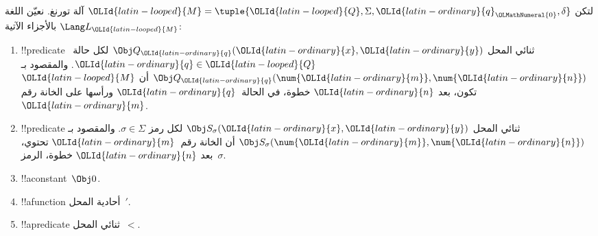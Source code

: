 \documentclass[../../../include/open-logic-section]{subfiles}
\begin{document}
\begin{defn}
لتكن $\OLId{latin-looped}{M}=\tuple{\OLId{latin-looped}{Q},\Sigma,\OLId{latin-ordinary}{q}_\OLMathNumeral{0},\delta}$ آلة تورنغ. نعيّن اللغة
$\Lang L_\OLId{latin-looped}{M}$ بالأجزاء الآتية:
\begin{enumerate}
\item !!{predicate} ثنائي المحل $ \Obj Q_\OLId{latin-ordinary}{q}(\OLId{latin-ordinary}{x},\OLId{latin-ordinary}{y})$ لكل حالة~$\OLId{latin-ordinary}{q}\in \OLId{latin-looped}{Q}$.
  والمقصود بـ$\Obj Q_\OLId{latin-ordinary}{q}(\num{\OLId{latin-ordinary}{m}},\num{\OLId{latin-ordinary}{n}})$ أن $\OLId{latin-looped}{M}$ تكون، بعد $\OLId{latin-ordinary}{n}$
  خطوة، في الحالة~$\OLId{latin-ordinary}{q}$ ورأسها على الخانة رقم~$\OLId{latin-ordinary}{m}$.
\item !!{predicate} ثنائي المحل $\Obj S_\sigma(\OLId{latin-ordinary}{x},\OLId{latin-ordinary}{y})$ لكل رمز
  $\sigma\in\Sigma$. والمقصود بـ$\Obj S_\sigma(\num{\OLId{latin-ordinary}{m}},\num{\OLId{latin-ordinary}{n}})$
  أن الخانة رقم~$\OLId{latin-ordinary}{m}$ تحتوي، بعد $\OLId{latin-ordinary}{n}$ خطوة، الرمز~$\sigma$.
\item !!a{constant}~$\Obj 0$.
\item !!a{function} أحادية المحل~$\prime$.
\item !!a{predicate} ثنائي المحل~$<$.
\end{enumerate}
\end{defn}
\end{document}
